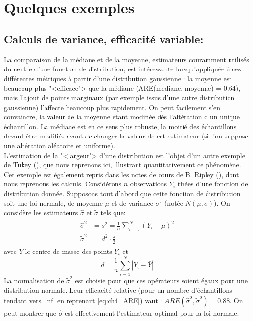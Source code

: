 \section{Quelques exemples}
\subsection{Calculs de variance, efficacité variable:}\label{sec:ch4_exemples_statitistiques}
La comparaison de la médiane et de la moyenne, estimateurs couramment utilisés du centre d'une fonction de distribution, est intéressante lorsqu'appliquée à ces différentes métriques à partir d'une distribution gaussienne : la moyenne est beaucoup plus "<efficace"> que la médiane (ARE(mediane, moyenne) = 0.64), mais l'ajout de points marginaux (par exemple issus d'une autre distribution gaussienne) l'affecte beaucoup plus rapidement. On peut facilement s'en convaincre, la valeur de la moyenne étant modifiée dès l'altération d'un unique échantillon. La médiane est en ce sens plus robuste, la moitié des échantillons devant être modifiés avant de changer la valeur de cet estimateur (si l'on suppose une altération aléatoire et uniforme). \\
L'estimation de la "<largeur"> d'une distribution est l'objet d'un autre exemple de Tukey (\cite{Tukey1960}), que nous reprenons ici, illustrant quantitativement ce phénomène. Cet exemple est également repris dans les notes de cours de B. Ripley (\cite{Ripley2004}), dont nous reprenons les calculs. Considérons $n$ observations $Y_i$ tirées d'une fonction de distribution donnée. Supposons tout d'abord que cette fonction de distribution soit une loi normale, de moyenne $\mu$ et de variance $\sigma^2$ (notée $N(\mu, \sigma)$). On considère les estimateurs $\hat{\sigma}$ et $\tilde{\sigma}$ tels que:
\begin{align}
	\begin{split}
		\hat{\sigma}^2 &= s^2 = \frac{1}{n} \sum\limits_{i=1}^{N} (Y_i - \mu)^2 \\
		\tilde{\sigma}^2 &= d^2 \cdot \frac{\pi}{2}
	\end{split}
\end{align}
avec $\bar{Y}$ le centre de masse des points $Y_i$ et 
\begin{equation*}
	d = \frac{1}{n} \sum\limits_{i=1}^{N} \left| Y_i - \bar{Y}\right| 
\end{equation*}
La normalisation de $\tilde{\sigma}^2$ est choisie pour que ces opérateurs soient égaux pour une distribution normale. Leur efficacité relative (pour un nombre d'échantillons tendant vers $\inf$ en reprenant \ref{eq:ch4_ARE}) vaut : $ARE(\hat{\sigma}^2, \tilde{\sigma}^2) = 0.88$. On peut montrer que $\hat{\sigma}$ est effectivement l'estimateur optimal pour la loi normale.\\

